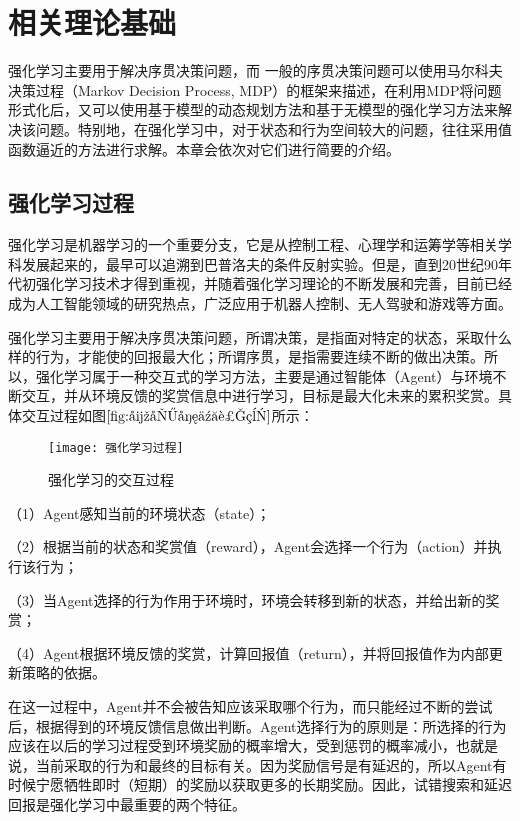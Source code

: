 \chapter{相关理论基础}
强化学习主要用于解决序贯决策问题，而
一般的序贯决策问题可以使用马尔科夫决策过程（Markov Decision Process, MDP）的框架来描述，在利用MDP将问题形式化后，又可以使用基于模型的动态规划方法和基于无模型的强化学习方法来解决该问题。特别地，在强化学习中，对于状态和行为空间较大的问题，往往采用值函数逼近的方法进行求解。本章会依次对它们进行简要的介绍。

\section{强化学习过程}
强化学习是机器学习的一个重要分支，它是从控制工程、心理学和运筹学等相关学科发展起来的，最早可以追溯到巴普洛夫的条件反射实验。但是，直到20世纪90年代初强化学习技术才得到重视，并随着强化学习理论的不断发展和完善，目前已经成为人工智能领域的研究热点，广泛应用于机器人控制、无人驾驶和游戏等方面。

强化学习主要用于解决序贯决策问题，所谓决策，是指面对特定的状态，采取什么样的行为，才能使的回报最大化；所谓序贯，是指需要连续不断的做出决策。所以，强化学习属于一种交互式的学习方法，主要是通过智能体（Agent）与环境不断交互，并从环境反馈的奖赏信息中进行学习，目标是最大化未来的累积奖赏。具体交互过程如图$\ref{fig:强化学习过程}$所示：
\begin{figure}[htbp]
\centering
\texttt{[image: 强化学习过程]}
\caption{强化学习的交互过程}
\label{fig:强化学习过程}
\end{figure}

（1）Agent感知当前的环境状态（state）；

（2）根据当前的状态和奖赏值（reward），Agent会选择一个行为（action）并执行该行为；

（3）当Agent选择的行为作用于环境时，环境会转移到新的状态，并给出新的奖赏；

（4）Agent根据环境反馈的奖赏，计算回报值（return），并将回报值作为内部更新策略的依据。

 在这一过程中，Agent并不会被告知应该采取哪个行为，而只能经过不断的尝试后，根据得到的环境反馈信息做出判断。Agent选择行为的原则是：所选择的行为应该在以后的学习过程受到环境奖励的概率增大，受到惩罚的概率减小，也就是说，当前采取的行为和最终的目标有关。因为奖励信号是有延迟的，所以Agent有时候宁愿牺牲即时（短期）的奖励以获取更多的长期奖励。因此，试错搜索和延迟回报是强化学习中最重要的两个特征。

